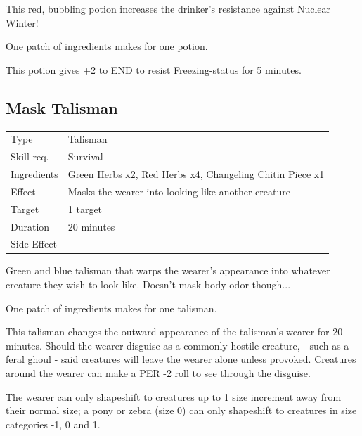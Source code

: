 \documentclass[11pt,a4paper,twocolumn]{book}
\begin{document}
\medskip

This red, bubbling potion increases the drinker's resistance against Nuclear Winter!

One patch of ingredients makes for one potion.

This potion gives +2 to END to resist Freezing-status for 5 minutes.




\subsection*{Mask Talisman}
{
	\begin{tabu} to 75mm{| X[l,4] | X[l,8] |}
		\hline
		Type 			& Talisman 													\\
        Skill req.	    & Survival  												\\
        Ingredients     & Green Herbs x2, Red Herbs x4, Changeling  Chitin Piece x1	\\
        Effect     		& Masks the wearer into looking like another creature 		\\
        Target      	& 1 target													\\
        Duration  		& 20 minutes	 											\\
        Side-Effect     & -															\\ \hline
	\end{tabu}
		
}

\medskip

Green and blue talisman that warps the wearer's appearance into whatever creature they wish to look like. Doesn't mask body odor though...

One patch of ingredients makes for one talisman.

This talisman changes the outward appearance of the talisman's wearer for 20 minutes. Should the wearer disguise as a commonly hostile creature, - such as a feral ghoul - said creatures will leave the wearer alone unless provoked. Creatures around the wearer can make a PER -2 roll to see through the disguise.

The wearer can only shapeshift to creatures up to 1 size increment away from their normal size; a pony or zebra (size 0) can only shapeshift to creatures in size categories -1, 0 and 1.
\end{document}
